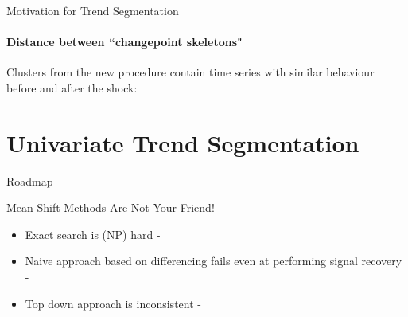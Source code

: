 \documentclass{beamer}
\begin{document}

\begin{frame}{Motivation for Trend Segmentation}
\framesubtitle{Distance between ``changepoint skeletons"}

Clusters from the new procedure contain time series with similar behaviour before and after the shock:

\bigskip

\begin{figure}
    \centering
    \begin{subfigure}
        \texttt{[image: ../plots/SnP500\_frechet\_similar\_1.png]}
    \end{subfigure}
    \begin{subfigure}
        \texttt{[image: ../plots/SnP500\_frechet\_similar\_2.png]}    
    \end{subfigure}
    \begin{subfigure}
        \texttt{[image: ../plots/SnP500\_frechet\_similar\_3.png]}
    \end{subfigure}
\end{figure}
    
\end{frame}




\section{Univariate Trend Segmentation}




\begin{frame}{Roadmap}
\tableofcontents[currentsection]
\end{frame}





\begin{frame}{Mean-Shift Methods Are Not Your Friend!}

\begin{itemize}

    \item Exact search is (NP) hard - \cite{weinmann2015iterative}

    \item Naive approach based on differencing fails even at performing signal recovery - \cite{maidstone2016efficient}
    
    \item Top down approach is inconsistent - \cite{baranowski2019narrowest}
    
\end{itemize}

\end{frame}
\end{document}
